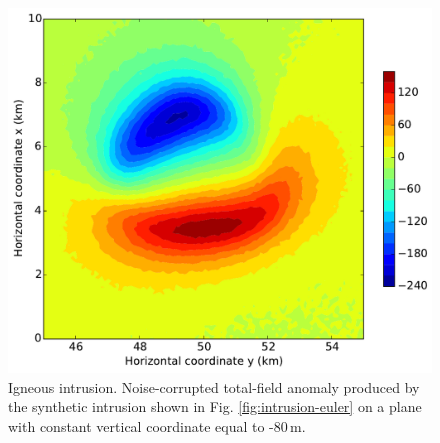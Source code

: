 \documentclass[journal abbreviation, npg]{copernicus}
\begin{document}
\begin{figure}[t]
\includegraphics[width=120mm]{Figures/npgd-2014-0069-f12}
\caption{Igneous intrusion. Noise-corrupted total-field anomaly
produced by the synthetic intrusion shown in Fig. \ref{fig:intrusion-euler}
on a plane with constant vertical coordinate equal to -80\,\unit{m}. }
\label{fig:intrusion-data}
\end{figure}

\end{document}
